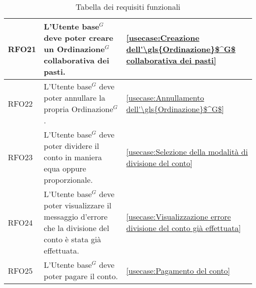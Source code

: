 \begin{table}[H]
\begin{tabularx}{\textwidth}{l|X|p{2cm}}
		\hline
		RFO21       & L'\gls{Utente base}$^G$ deve poter creare un \gls{Ordinazione}$^G$ collaborativa dei pasti.                                        & \autoref{usecase:Creazione dell'\gls{Ordinazione}$^G$ collaborativa dei pasti}        \\
		\hline
		RFO22       & L'\gls{Utente base}$^G$ deve poter annullare la propria \gls{Ordinazione}$^G$.                                                     & \autoref{usecase:Annullamento dell'\gls{Ordinazione}$^G$}                             \\
		\hline
		RFO23       & L'\gls{Utente base}$^G$ deve poter dividere il conto in maniera equa oppure proporzionale.                                                    & \autoref{usecase:Selezione della modalità di divisione del conto}           \\
		\hline
		RFO24       & L'\gls{Utente base}$^G$ deve poter visualizzare il messaggio d'errore che la divisione del conto è stata già effettuata. & \autoref{usecase:Visualizzazione errore divisione del conto già effettuata} \\
		\hline
		RFO25       & L'\gls{Utente base}$^G$ deve poter pagare il conto.                                                                      & \autoref{usecase:Pagamento del conto}                                       \\
	\end{tabularx}
	\caption{Tabella dei requisiti funzionali}
\end{table}


